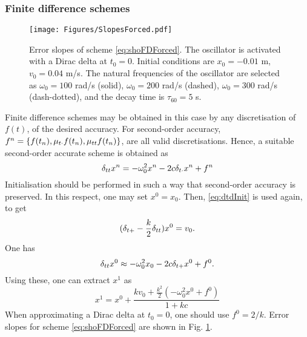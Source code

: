 \subsubsection{Finite difference schemes}
\begin{figure}[hbt]
    \centering
    \texttt{[image: Figures/SlopesForced.pdf]}
    \caption{Error slopes of scheme \eqref{eq:shoFDForced}. The oscillator is activated with a Dirac delta at $t_0=0$. Initial conditions are $x_0=-0.01$ m, $v_0=0.04$ m/s. The natural frequencies of the oscillator are selected as $\omega_0 = 100$ rad/s (solid), $\omega_0 = 200$ rad/s (dashed), $\omega_0 = 300$ rad/s (dash-dotted), and the decay time is $\tau_{60} = 5$ s.}\label{fig:ErrSlopesForced}
\end{figure}
Finite difference schemes may be obtained in this case by any discretisation of $f(t)$, of the desired accuracy. For second-order accuracy, $f^n = \left\{f(t_n),\mu_{t\cdot} f(t_n), \mu_{tt} f(t_n) \right\}$, are all valid discretisations. Hence, a suitable second-order accurate scheme is obtained as
\begin{equation}\label{eq:shoFDForced}
    \delta_{tt} x^n = -\omega_0^2 x^n -2c\delta_{t\cdot} x^n + f^n
\end{equation}
Initialisation should be performed in such a way that second-order accuracy is preserved. In this respect, one may set $x^0 = x_0$. Then,
\eqref{eq:dtdInit} is used again, to get
\begin{equation}
    (\delta_{t+} - \frac{k}{2}\delta_{tt})x^0 = v_0.
\end{equation}
One has
\begin{equation}
    \delta_{tt} x^0 \approx -\omega_0^2 x_0 - 2c \delta_{t+} x^0 + f^0.
\end{equation}
Using these, one can extract $x^1$ as 
\begin{equation}
    x^1 = x^0 + \frac{k v_0 + \frac{k^2}{2}\left(-\omega_0^2 x^0 + f^0 \right)}{1+kc}
\end{equation}
When approximating a Dirac delta at $t_0=0$, one should use $f^0 = 2/k$. Error slopes for scheme \eqref{eq:shoFDForced} are shown in Fig.  \ref{fig:ErrSlopesForced}.

